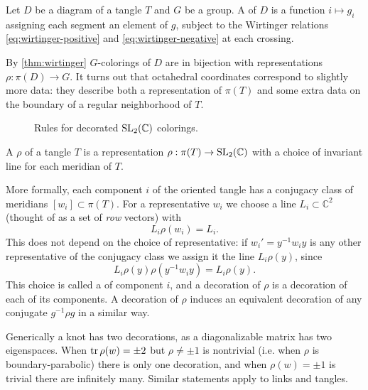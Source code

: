 \documentclass[leqno]{sl2art}
\begin{document}
\begin{definition}
  Let \(D\) be a diagram of a tangle \(T\) and \(G\) be a group.
  A  of \(D\) is a function \(i \mapsto g_i\) assigning each segment an element of \(g\), subject to the Wirtinger relations \eqref{eq:wirtinger-positive} and \eqref{eq:wirtinger-negative} at each crossing.%
\end{definition}

By \cref{thm:wirtinger} \(G\)-colorings of \(D\) are in bijection with representations \(\rho : \pi(D) \to G\).
%
It turns out that octahedral coordinates correspond to slightly more data: they describe both a representation of \(\pi(T)\) and some extra data on the boundary of a regular neighborhood of \(T\).

\begin{figure}
  \centering
  
  \caption{Rules for decorated \(\operatorname{SL}_2(\mathbb{C})\) colorings.}
  \label{fig:decorated-quandle-rule}
\end{figure}

\begin{definition}
  A  \(\rho\) of a tangle \(T\) is a representation \(\rho : \pi(T) \to \operatorname{SL}_2(\mathbb{C})\) with a choice of invariant line for each meridian of \(T\).

  More formally, each component \(i\) of the oriented tangle has a conjugacy class of meridians \([w_i] \subset \pi(T)\).
  For a representative \(w_i\) we choose a line \(L_i \subset \mathbb{C}^2\) (thought of as a set of \emph{row} vectors) with
  \[
    L_i \rho(w_i) = L_i.
  \]
  This does not depend on the choice of representative: if \(w_i' = y^{-1} w_i y\) is any other representative of the conjugacy class we assign it the line \(L_i \rho(y)\), since
  \[
    L_i \rho(y) \rho(y^{-1} w_i y) = L_i \rho(y).
  \]
  This choice is called a  of component \(i\), and a decoration of \(\rho\) is a decoration of each of its components.
  A decoration of \(\rho\) induces an equivalent decoration of any conjugate \(g^{-1} \rho g\) in a similar way.
\end{definition}

Generically a knot has two decorations, as a diagonalizable matrix has two eigenspaces.
When \(\operatorname{tr} \rho(w) = \pm 2\) but \(\rho \ne \pm 1\) is nontrivial (i.e. when \(\rho\) is boundary-parabolic) there is only one decoration, and when \(\rho(w) = \pm 1\) is trivial there are infinitely many.
Similar statements apply to links and tangles.
\end{document}
